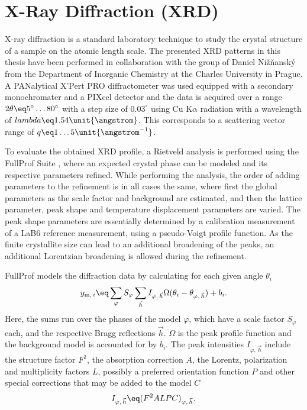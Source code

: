 \documentclass[\main/dresen_thesis.tex]{subfiles}
\begin{document}
  \section{X-Ray Diffraction (XRD)}
    \label{app:methods:xrd}
    X-ray diffraction is a standard laboratory technique to study the crystal structure of a sample on the atomic length scale.
    The presented XRD patterns in this thesis have been performed in collaboration with the group of Daniel Nižňanský from the Department of Inorganic Chemistry at the Charles University in Prague.
    A PANalytical X'Pert PRO diffractometer was used equipped with a secondary monochromater and a PIXcel detector and the data is acquired over a range $2 \theta \eq 5^\circ \ldots 80^\circ$ with a step size of $0.03^\circ$ using Cu K$\alpha$ radiation with a wavelength of $lambda \eq 1.54 \unit{\angstrom}$.
    This corresponds to a scattering vector range of $q \eq 1 \ldots 5 \unit{\angstrom^{-1}}$.

    To evaluate the obtained XRD profile, a Rietveld analysis is performed using the FullProf Suite \cite{Rodriguez_1993_Recen}, where an expected crystal phase can be modeled and its respective parameters refined.
    While performing the analysis, the order of adding parameters to the refinement is in all cases the same, where first the global parameters as the scale factor and background are estimated, and then the lattice parameter, peak shape and temperature displacement parameters are varied.
    The peak shape parameters are essentially determined by a calibration measurement of a LaB6 reference measurement, using a pseudo-Voigt profile function.
    As the finite crystallite size can lead to an additional broadening of the peaks, an additional Lorentzian broadening is allowed during the refinement.

    FullProf models the diffraction data by calculating for each given angle $\theta_i$
    \begin{align}
      y_{\mathrm{m}, \, i} \eq
        \sum_{\varphi} S_{\varphi}
        \sum_{\vec{h}}
          I_{\varphi, \, \vec{h}}
          \Omega ( \theta_{i} - \theta_{\varphi, \, \vec{h}})
        + b_i.
    \end{align}
    Here, the sums run over the phases of the model $\varphi$, which have a scale factor $S_{\varphi}$ each, and the respective Bragg reflections $\vec{h}$.
    $\Omega$ is the peak profile function and the background model is accounted for by $b_i$.
    The peak intensities $I_{\varphi, \, \vec{h}}$ include the structure factor $F^2$, the absorption correction $A$, the Lorentz, polarization and multiplicity factors $L$, possibly a preferred orientation function $P$ and other special corrections that may be added to the model $C$
    \begin{align}
      I_{\varphi, \, \vec{h}} \eq (F^2 A L P C)_{\varphi, \, \vec{h}}.
    \end{align}
\end{document}
